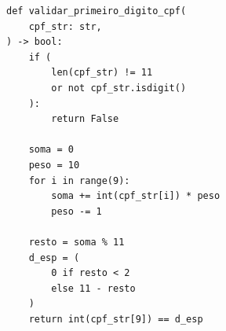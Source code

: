 \ifmostrarGabarito
\begin{verbatim}
def validar_primeiro_digito_cpf(
    cpf_str: str,
) -> bool:
    if (
        len(cpf_str) != 11
        or not cpf_str.isdigit()
    ):
        return False
    
    soma = 0
    peso = 10
    for i in range(9):
        soma += int(cpf_str[i]) * peso
        peso -= 1
        
    resto = soma % 11
    d_esp = (
        0 if resto < 2
        else 11 - resto
    )
    return int(cpf_str[9]) == d_esp
\end{verbatim}

\fi
